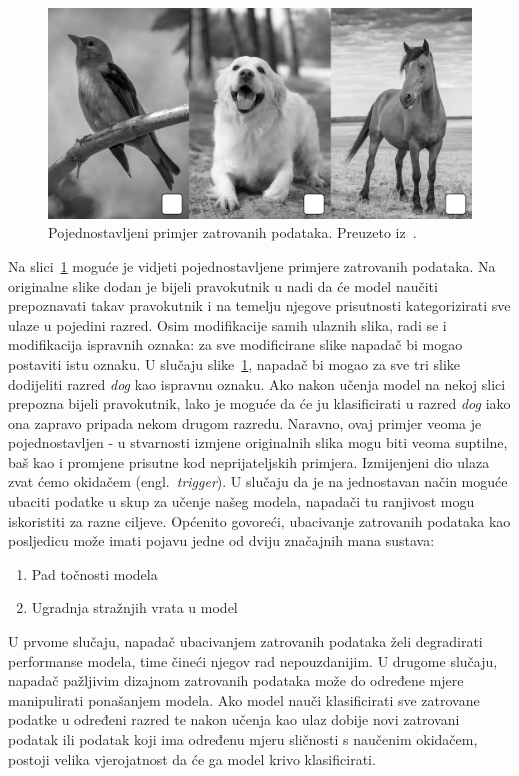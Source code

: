 \documentclass[times, utf8, zavrsni, numeric]{fer}
\begin{document}
\begin{figure}[htb]
    \centering
    \includegraphics[scale=0.4]{poisoned_img.png}
    \caption{Pojednostavljeni primjer zatrovanih podataka. Preuzeto iz~\cite{menon2023poisoned}.}
    \label{fig:poisoned_imgs}
\end{figure}

Na slici~\ref{fig:poisoned_imgs} moguće je vidjeti pojednostavljene primjere zatrovanih podataka. 
Na originalne slike dodan je bijeli pravokutnik u nadi da će model naučiti prepoznavati takav pravokutnik i na temelju njegove prisutnosti kategorizirati sve ulaze u pojedini razred.
Osim modifikacije samih ulaznih slika, radi se i modifikacija ispravnih oznaka: za sve modificirane slike napadač bi mogao postaviti istu oznaku.
U slučaju slike~\ref{fig:poisoned_imgs}, napadač bi mogao za sve tri slike dodijeliti razred \textit{dog} kao ispravnu oznaku. 
Ako nakon učenja model na nekoj slici prepozna bijeli pravokutnik, lako je moguće da će ju klasificirati u razred \textit{dog} iako ona zapravo pripada nekom drugom razredu.
Naravno, ovaj primjer veoma je pojednostavljen - u stvarnosti izmjene originalnih slika mogu biti veoma suptilne, baš kao i promjene prisutne kod neprijateljskih primjera.
Izmijenjeni dio ulaza zvat ćemo okidačem (engl.\ \textit{trigger}).
U slučaju da je na jednostavan način moguće ubaciti podatke u skup za učenje našeg modela, napadači tu ranjivost mogu iskoristiti za razne ciljeve.
Općenito govoreći, ubacivanje zatrovanih podataka kao posljedicu može imati pojavu jedne od dviju značajnih mana sustava:

\begin{enumerate}
    \item Pad točnosti modela
    \item Ugradnja stražnjih vrata u model
\end{enumerate}

U prvome slučaju, napadač ubacivanjem zatrovanih podataka želi degradirati performanse modela, time čineći njegov rad nepouzdanijim.
U drugome slučaju, napadač pažljivim dizajnom zatrovanih podataka može do određene mjere manipulirati ponašanjem modela. 
Ako model nauči klasificirati sve zatrovane podatke u određeni razred te nakon učenja kao ulaz dobije novi zatrovani podatak ili podatak koji ima određenu mjeru sličnosti s naučenim okidačem,
postoji velika vjerojatnost da će ga model krivo klasificirati.  
\end{document}
